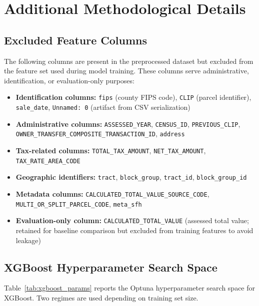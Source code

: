 \appendix

\section{Additional Methodological Details}\label{app:methods}

\subsection{Excluded Feature Columns}\label{app:excluded_columns}

The following columns are present in the preprocessed dataset but excluded from the feature set used during model training. These columns serve administrative, identification, or evaluation-only purposes:

\begin{itemize}
    \item \textbf{Identification columns:} \texttt{fips} (county FIPS code), \texttt{CLIP} (parcel identifier), \texttt{sale\_date}, \texttt{Unnamed:~0} (artifact from CSV serialization)
    \item \textbf{Administrative columns:} \texttt{ASSESSED\_YEAR}, \texttt{CENSUS\_ID}, \texttt{PREVIOUS\_CLIP}, \texttt{OWNER\_TRANSFER\_COMPOSITE\_TRANSACTION\_ID}, \texttt{address}
    \item \textbf{Tax-related columns:} \texttt{TOTAL\_TAX\_AMOUNT}, \texttt{NET\_TAX\_AMOUNT}, \texttt{TAX\_RATE\_AREA\_CODE}
    \item \textbf{Geographic identifiers:} \texttt{tract}, \texttt{block\_group}, \texttt{tract\_id}, \texttt{block\_group\_id}
    \item \textbf{Metadata columns:} \texttt{CALCULATED\_TOTAL\_VALUE\_SOURCE\_CODE}, \texttt{MULTI\_OR\_SPLIT\_PARCEL\_CODE}, \texttt{meta\_sfh}
    \item \textbf{Evaluation-only column:} \texttt{CALCULATED\_TOTAL\_VALUE} (assessed total value; retained for baseline comparison but excluded from training features to avoid leakage)
\end{itemize}

\subsection{XGBoost Hyperparameter Search Space}\label{app:xgboost_hyperparams}

Table~\ref{tab:xgboost_params} reports the Optuna hyperparameter search space for XGBoost. Two regimes are used depending on training set size.

